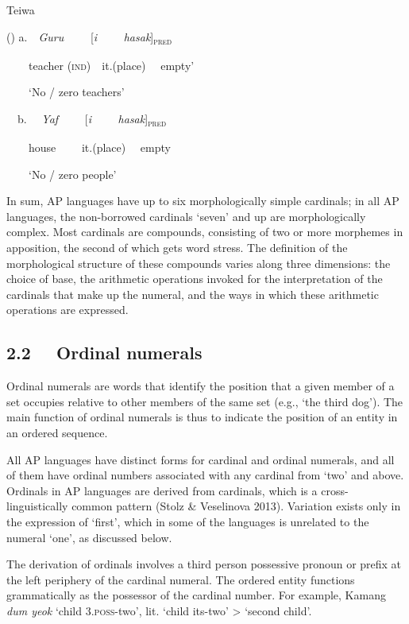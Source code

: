 Teiwa 

\label{bkm:Ref355363568}() a.\ \ \textit{Guru \ \   \ \ }[\textit{i \ \ \ \ hasak}]\textsc{\textsubscript{pred}}\textit{ }

\ \ \ \ teacher \textsc{(ind)}\ \  it.(place)  \ \ empty{\textquoteright} 

\ \ \ \ {\textquoteleft}No / zero teachers{\textquoteright} 

\ \ b. \ \ \textit{Yaf \ \ \ \ }[\textit{i \ \ \ \ hasak}]\textsc{\textsubscript{pred}}\textit{ }

\ \ \ \ house  \ \ \ \ it.(place) \ \ empty

\ \ \ \ {\textquoteleft}No / zero people{\textquoteright} 

In sum, AP languages have up to six morphologically simple cardinals; in all AP languages, the non-borrowed cardinals {\textquoteleft}seven{\textquoteright} and up are morphologically complex. Most cardinals are compounds, consisting of two or more morphemes in apposition, the second of which gets word stress. The definition of the morphological structure of these compounds varies along three dimensions: the choice of base, the arithmetic operations invoked for the interpretation of the cardinals that make up the numeral, and the ways in which these arithmetic operations are expressed. 

\subsection[2.2 \ \ Ordinal numerals]{\textup{2.2 \ \ Ordinal numerals}}
\hypertarget{RefHeading105234871885726}{}Ordinal numerals are words that identify the position that a given member of a set occupies relative to other members of the same set (e.g., {\textquoteleft}the third dog{\textquoteright}). The main function of ordinal numerals is thus to indicate the position of an entity in an ordered sequence. 

All AP languages have distinct forms for cardinal and ordinal numerals, and all of them have ordinal numbers associated with any cardinal from {\textquoteleft}two{\textquoteright} and above. Ordinals in AP languages are derived from cardinals, which is a cross-linguistically common pattern (Stolz \& Veselinova 2013). Variation exists only in the expression of {\textquoteleft}first{\textquoteright}, which in some of the languages is unrelated to the numeral {\textquoteleft}one{\textquoteright}, as discussed below. 

The derivation of ordinals involves a third person possessive pronoun or prefix at the left periphery of the cardinal numeral. The ordered entity functions grammatically as the possessor of the cardinal number. For example, Kamang \textit{dum yeok} {\textquoteleft}child 3.\textsc{poss}{}-two{\textquoteright}, lit. {\textquoteleft}child its-two{\textquoteright} {\textgreater} {\textquoteleft}second child{\textquoteright}. 

